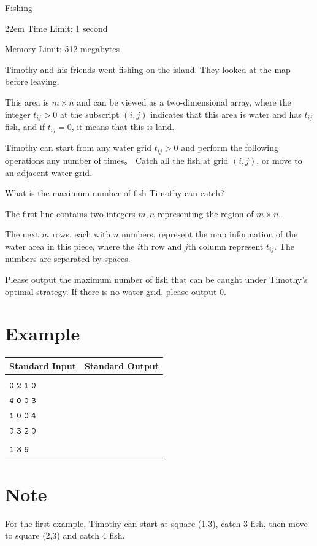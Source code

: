 \documentclass{xcpc}
\begin{document}
	\begin{problem}{Fishing}
		\begin{boxedminipage}[c][1cm][t]{22em} 
			Time Limit: 1 second
			
			Memory Limit: 512 megabytes
		\end{boxedminipage}
		
		Timothy and his friends went fishing on the island. They looked at the map before leaving.
		
		This area is $m \times n$ and can be viewed as a two-dimensional array, where the integer $t_{ij}>0$ at the subscript $(i, j)$ indicates that this area is water and has $t_{ij}$ fish, and if $t_{ij}=0$, it means that this is land.
		
		Timothy can start from any water grid $t_{ij}>0$ and perform the following operations any number of times。 Catch all the fish at grid $(i, j)$, or move to an adjacent water grid.
		
		What is the maximum number of fish Timothy can catch?
	
	
	\begin{inputdes}
		The first line contains two integers $m,n$ representing the region of $m\times n$.
		
		The next $m$ rows, each with $n$ numbers, represent the map information of the water area in this piece, where the $i$th row and $j$th column represent $t_{ij}$. The numbers are separated by spaces.
	\end{inputdes}
	
	\begin{outputdes}
		Please output the maximum number of fish that can be caught under Timothy's optimal strategy. If there is no water grid, please output 0.
	\end{outputdes}
	
	\section*{Example}

	\begin{table}[h]
		\begin{tabularx}{\textwidth}{|>{\raggedright\arraybackslash}X|>{\raggedright\arraybackslash}X|}
			\hline
			\textbf{Standard Input} & \textbf{Standard Output} \\ \hline
		\makecell[l]{$\tt{4\ 4}$\\$\tt{0\ 2\ 1\ 0}$\\$\tt{4\ 0\ 0\ 3}$\\$\tt{1\ 0\ 0\ 4}$\\$\tt{0\ 3\ 2\ 0}$} & \makecell[l]{$\tt{7}$} \\ \hline
		\makecell[l]{$\tt{1\ 3}$\\$\tt{1\ 3\ 9}$} & \makecell[l]{$\tt{13}$} \\ \hline
		\end{tabularx}
	\end{table}
	
	\section*{Note}
	
	For the first example, Timothy can start at square (1,3), catch 3 fish, then move to square (2,3) and catch 4 fish.
	\end{problem}
\end{document}
